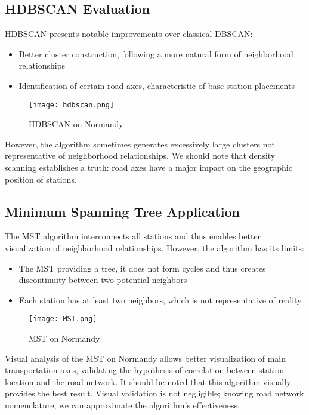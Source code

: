 \documentclass[12pt,a4paper]{report}
\begin{document}
\subsection{HDBSCAN Evaluation}

HDBSCAN presents notable improvements over classical DBSCAN:
\begin{itemize}
    \item Better cluster construction, following a more natural form of neighborhood relationships
    \item Identification of certain road axes, characteristic of base station placements
\end{itemize}

\begin{figure}[h]
    \centering
    \texttt{[image: hdbscan.png]}
    \caption{HDBSCAN on Normandy}
    \label{fig:image_unique}
\end{figure}

However, the algorithm sometimes generates excessively large clusters not representative of neighborhood relationships. We should note that density scanning establishes a truth: road axes have a major impact on the geographic position of stations.

\subsection{Minimum Spanning Tree Application}

The MST algorithm interconnects all stations and thus enables better visualization of neighborhood relationships. However, the algorithm has its limits:
\begin{itemize}
    \item The MST providing a tree, it does not form cycles and thus creates discontinuity between two potential neighbors
    \item Each station has at least two neighbors, which is not representative of reality
\end{itemize}

\begin{figure}[h]
    \centering
    \texttt{[image: MST.png]}
    \caption{MST on Normandy}
    \label{fig:image_unique}
\end{figure}

Visual analysis of the MST on Normandy allows better visualization of main transportation axes, validating the hypothesis of correlation between station location and the road network. It should be noted that this algorithm visually provides the best result. Visual validation is not negligible; knowing road network nomenclature, we can approximate the algorithm's effectiveness.
\end{document}

